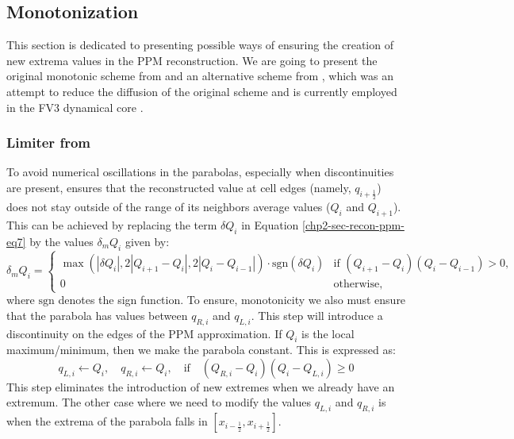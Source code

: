 \subsection{Monotonization}
	\label{chp2-sec-mono}
	This section is dedicated to presenting possible ways of ensuring the creation of new 
extrema values in the PPM reconstruction. We are going to present the original 
monotonic scheme from \citet{colella:1984} and an alternative scheme from \citet{lin:2004},
which was an attempt to reduce the diffusion of the original scheme \citet{colella:1984}
and is currently employed in the FV3 dynamical core \citep{harris:2021}.
		
\subsubsection{Limiter from \citet{colella:1984}}
To avoid numerical oscillations in the parabolas, especially when discontinuities are present,
\citet{colella:1984} ensures that the reconstructed value 
at cell edges (namely, $q_{i+\frac{1}{2}}$) does not stay outside of the range of its 
neighbors average values ($Q_{i}$ and $Q_{i+1}$).
This can be achieved by replacing the term $\delta Q_i$ in Equation \eqref{chp2-sec-recon-ppm-eq7}
by the values $\delta_m Q_i$ given by:
\begin{equation}
	\label{chp2-sec-mono-eq1}
	\delta_m Q_{i} =
	\begin{cases}
		\max(|\delta Q_i|,2|Q_{i+1}-Q_{i}|, 2|Q_{i}-Q_{i-1}|) \cdot \text{sgn}(\delta Q_i)& 
		\text{if } (Q_{i+1}-Q_{i})(Q_{i}-Q_{i-1}) > 0,\\
		0 & \text{otherwise,} 
	\end{cases}
\end{equation}
where $\text{sgn}$ denotes the sign function.
To ensure, monotonicity we also must ensure that the parabola has values between
$q_{R,i}$ and $q_{L,i}$.
This step will introduce a discontinuity on the edges of the PPM approximation.
If $Q_i$ is the local maximum/minimum, then we make the parabola constant. 
This is expressed as:
	\begin{equation}
		\label{chp2-sec-mono-eq2}
		q_{L,i} \leftarrow Q_i, \quad q_{R,i} \leftarrow Q_i, \quad \text{if} \quad (Q_{R,i}-Q_i)(Q_i-Q_{L,i}) \geq 0
	\end{equation}
	This step eliminates the introduction of new extremes when we already have an extremum.
The other case where we need to modify the values $q_{L,i}$ and $q_{R,i}$
is when the extrema of the parabola falls in $[x_{i-\frac{1}{2}},x_{i+\frac{1}{2}}]$.
